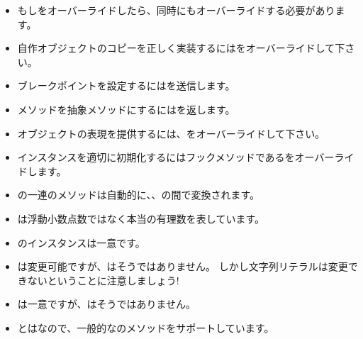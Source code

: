 \documentclass[a4paper,10pt,twoside]{book}
\begin{document}
\begin{itemize}

  \item もし\ct{=}をオーバーライドしたら、同時にもオーバーライドする必要があります。

  \item 自作オブジェクトのコピーを正しく実装するにはをオーバーライドして下さい。

  \item ブレークポイントを設定するにはを送信します。

  \item メソッドを抽象メソッドにするにはを返します。

  \item オブジェクトの表現を提供するには、をオーバーライドして下さい。

  \item インスタンスを適切に初期化するにはフックメソッドであるをオーバーライドします。

  \item {}の一連のメソッドは自動的に、、の間で変換されます。

  \item {}は浮動小数点数ではなく本当の有理数を表しています。

  \item {}のインスタンスは一意です。

  \item {}は変更可能ですが、はそうではありません。
  しかし文字列リテラルは変更できないということに注意しましょう!

  \item {}は一意ですが、はそうではありません。

  \item {}とはなので、一般的なのメソッドをサポートしています。

\end{itemize}

\ifx\wholebook\relax\else
   
   
\end{document}
